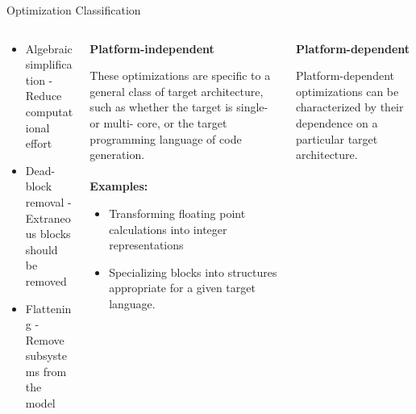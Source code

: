\documentclass[final,hyperref={pdfpagelabels=false}]{beamer}
\begin{document}
\begin{frame}{}
\begin{block}{Optimization Classification}
\begin{columns}[t,totalwidth=\linewidth]
\begin{column}{.19\linewidth}
           \begin{itemize}
           \footnotesize
           \item Algebraic simplification - Reduce computational effort
           \item Dead-block removal - Extraneous blocks should be removed
           \item Flattening - Remove subsystems from the model
           \end{itemize}
           
           \end{column}
           \hspace{-1.2cm}\vrule\hspace{.05cm}
           \begin{column}{.19\linewidth}
           \small
          \begin{center}\textbf{Platform-independent}\end{center}
          \footnotesize
            These optimizations are specific to a general class
            of target architecture, such as whether the target is single- or multi- core, or the
            target programming language of code generation. \\~\\
                       
           \textbf{Examples:}
           
           \begin{itemize}
           \footnotesize
           \item Transforming floating point calculations into integer representations
           \item Specializing blocks into structures appropriate for a given target language.
           \end{itemize}
            \end{column}
            \hspace{-1.2cm}\vrule\hspace{.05cm}
            \begin{column}{.17\linewidth}
            \small
          \begin{center}\textbf{Platform-dependent}\end{center}
          \footnotesize
            Platform-dependent optimizations can be characterized by their dependence on a particular target
            architecture.\\~\\~\\
                                   

\end{column}
\end{columns}
\end{block}
\end{frame}
\end{document}
